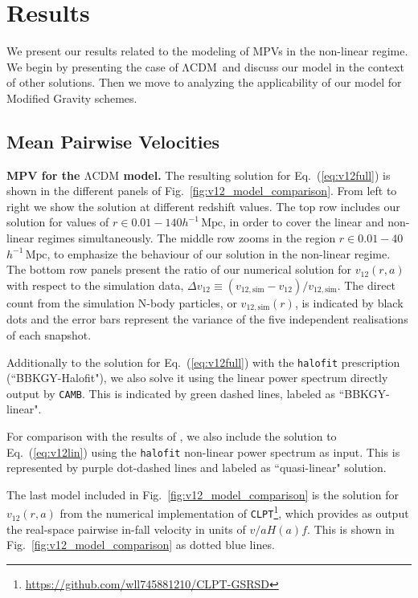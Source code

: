 \documentclass[%
 reprint,
groupedaddress,
nofootinbib,
nobibnotes,
 amsmath,amssymb,
 aps,
]{revtex4-2}
\newcommand{\code}[1]{{\texttt{#1}}}
\newcommand{\refeq}[1]{Eq.~(\ref{eq:#1})}
\newcommand{\reffig}[1]{Fig.~\ref{fig:#1}}
\newcommand{\pairvel}{$v_{12}(r,a)$}
\newcommand{\lcdm}{$\mathrm{\Lambda CDM}$}
\newcommand{\vot}{$v_{12}$}  %
\newcommand{\Mpch}{$h^{-1}\,\mbox{Mpc}$}
\newcommand{\<}{\langle}
\renewcommand{\>}{\rangle}
\begin{document}
\section{\label{sec:results}Results}

We present our results related to the modeling of MPVs in the non-linear regime. We begin by presenting the case of \lcdm\-\ and discuss our model in the context of other solutions. Then we move to analyzing the applicability of our model for Modified Gravity schemes.

\subsection{\label{subsec:resultslcdm} Mean Pairwise Velocities}
\textbf{MPV for the \lcdm{} model.}
The resulting solution for \refeq{v12full} is shown in the different panels of \reffig{v12_model_comparison}.  From left to right we show the solution at different redshift values. The top row includes our solution for values of $r \in 0.01-140$\Mpch, in order to cover the linear and non-linear regimes simultaneously. The middle row zooms in the region $r \in 0.01-40$\Mpch, to emphasize the behaviour of our solution in the non-linear regime. The bottom row panels present the ratio of our numerical solution for \pairvel{} with respect to the simulation data, $\Delta$\vot{}$\equiv (v_{12, \text{sim}}-v_{12})/v_{12, \text{sim}}$. The direct count from the simulation N-body particles, or $v_{12, \text{sim}}(r)$, is indicated by black dots and the error bars represent the variance of the five independent realisations of each snapshot.

Additionally to the solution for \refeq{v12full}  with the \code{halofit} prescription (``BBKGY-Halofit"), we also solve it using the linear power spectrum directly output by \code{CAMB}. This is indicated by green dashed lines, labeled as ``BBKGY-linear".

For comparison with the results of \cite{Juszkiewicz_1999}, we also include the solution to \refeq{v12lin}  using the \code{halofit} non-linear power spectrum as input. This is represented by purple dot-dashed lines and labeled as  ``quasi-linear"  solution. 

The last  model included in \reffig{v12_model_comparison} is the solution for \pairvel{} from the numerical implementation of \code{CLPT}\footnote{\href{https://github.com/wll745881210/CLPT_GSRSD}{https://github.com/wll745881210/CLPT-GSRSD}}, which provides as output the real-space pairwise in-fall velocity in units of $v/aH(a)f$. This is shown in \reffig{v12_model_comparison} as  dotted blue lines. 
\end{document}
